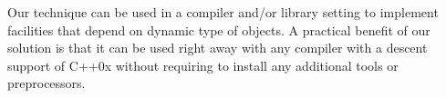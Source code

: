 \noindent
Our technique can be used in a compiler and/or library setting to implement 
facilities that depend on dynamic type of objects. A practical benefit of our 
solution is that it can be used right away with any compiler with a descent 
support of C++0x without requiring to install any additional tools or 
preprocessors.
